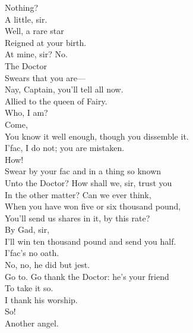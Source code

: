 \documentclass[a4paper,oneside,12pt]{memoir}
\begin{document}
\begin{drama*}
\facespeaks Nothing?\\
\dapperspeaks {} A little, sir.\\
\facespeaks {} Well, a rare star\\
Reigned at your birth.\\
\dapperspeaks {} At mine, sir? No.\\
\facespeaks {} The Doctor\\
Swears that you are---\\
\subtlespeaks {} Nay, Captain, you'll tell all now.\\
\facespeaks Allied to the queen of Fairy.\\
\dapperspeaks {} Who, I am?\\
\facespeaks {} Come,\\
You know it well enough, though you dissemble it.\\
\dapperspeaks I'fac, I do not; you are mistaken.\\
\facespeaks {} How!\\
Swear by your fac and in a thing so known\\
Unto the Doctor? How shall we, sir, trust you\\
In the other matter? Can we ever think,\\
When you have won five or six thousand pound,\\
You'll send us shares in it, by this rate?\\
\dapperspeaks {} By Gad, sir,\\
I'll win ten thousand pound and send you half.\\
I'fac's no oath.\\
\subtlespeaks {} No, no, he did but jest.\\
\facespeaks Go to. Go thank the Doctor: he's your friend\\
To take it so.\\
\dapperspeaks {} I thank his worship.\\
\facespeaks {} So!\\
Another angel.\\

\end{drama*}
\end{document}
